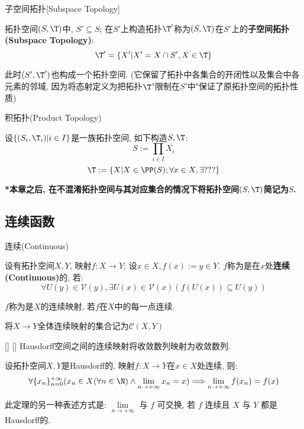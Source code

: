 \documentclass[UTF8]{ctexart}
\begin{document}
            \begin{dfn}
                {子空间拓扑}[Subspace Topology]

                拓扑空间$(S,\T)$中, $S'\subseteq S$; 在$S'$上构造拓扑$\T'$称为$(S,\T)$在$S'$上的\textbf{子空间拓扑(Subspace Topology)}: 
                \[\T'=\{X'|X'=X\cap S', X\in\T\}\]

                此时$(S',\T')$也构成一个拓扑空间. (它保留了拓扑中各集合的开闭性以及集合中各元素的邻域, 因为将态射定义为把拓扑$\T$"限制在$S'$中"保证了原拓扑空间的拓扑性质)
            \end{dfn}
            
            \begin{dfn}
                {积拓扑(Product Topology)}

                设$\{(S_i,\T_i)|i\in I\}$是一族拓扑空间, 如下构造$S,\T$: 
                \[S:=\prod_{i\in I}X_i\]
                \[\T:=\{X|X\in\PP(S); \forall x\in X, \exists ??? \}\]
            \end{dfn}

            \textbf{*本章之后, 在不混淆拓扑空间与其对应集合的情况下将拓扑空间$(S,\T)$简记为$S$. }

        \subsection{连续函数}

            \begin{dfn}
                {连续(Continuous)}

                设有拓扑空间$X,Y$, 映射$f:X\to Y$; 设$x\in X, f(x):=y\in Y$. $f$称为是在$x$处\textbf{连续(Continuous)}的, 若: 
                \[\forall U(y)\in \mathcal{V}(y), \exists U(x)\in \mathcal{V}(x)(f\left(U(x)\right)\subseteq U(y))\]

                $f$称为是$X$的连续映射, 若$f$在$X$中的每一点连续. 

                将$X\to Y$全体连续映射的集合记为$\mathcal{C}(X,Y)$
            \end{dfn}
            
            \begin{thm}
                []
                {}
                []
                []
                Hausdorff空间之间的连续映射将收敛数列映射为收敛数列. 

                设拓扑空间$X,Y$是Hausdorff的, 映射$f:X\to Y$在$x\in X$处连续, 则: 
                \[\forall\{x_n\}_{n=0}^{+\infty}(x_n\in X(\forall n\in\N)\wedge\lim_{n\to+\infty}x_n=x)\Longrightarrow\lim_{n\to+\infty}f(x_n)=f(x)\]

                此定理的另一种表述方式是: $\lim\limits_{n\to+\infty}$ 与 $f$ 可交换, 若 $f$ 连续且 $X$ 与 $Y$ 都是Hausdorff的. 
            \end{thm}
\end{document}
